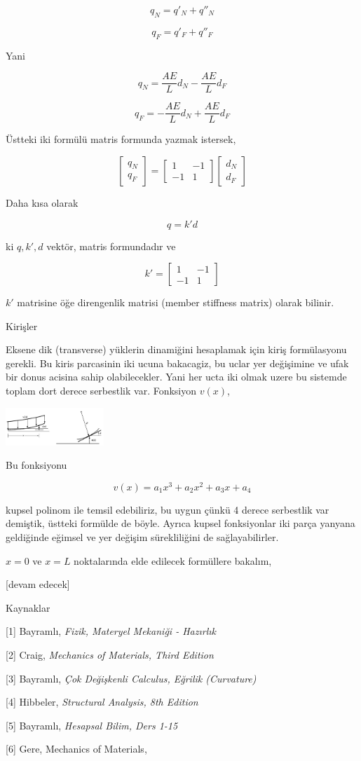 \documentclass[12pt,fleqn]{article}\usepackage{../../common}
\begin{document}
$$
q_N = q'_N + q''_N 
$$

$$
q_F = q'_F + q''_F
$$

Yani

$$
q_N = \frac{AE}{L} d_N - \frac{AE}{L} d_F
$$

$$
q_F = -\frac{AE}{L} d_N + \frac{AE}{L} d_F
$$

Üstteki iki formülü matris formunda yazmak istersek,

$$
\left[\begin{array}{c}
q_N \\ q_F
\end{array}\right] =
\left[\begin{array}{cc}
1 & -1 \\ -1 & 1
\end{array}\right]
\left[\begin{array}{c}
d_N \\ d_F
\end{array}\right] 
$$

Daha kısa olarak

$$
q = k' d
$$

ki $q,k',d$ vektör, matris formundadır ve

$$
k' = \left[\begin{array}{cc}
1 & -1 \\ -1 & 1
\end{array}\right]
$$

$k'$ matrisine öğe direngenlik matrisi (member stiffness matrix) olarak bilinir.

Kirişler

Eksene dik (transverse) yüklerin dinamiğini hesaplamak için kiriş formülasyonu
gerekli. Bu kiris parcasinin iki ucuna bakacagiz, bu uclar yer değişimine ve
ufak bir donus acisina sahip olabilecekler. Yani her ucta iki olmak uzere
bu sistemde toplam dort derece serbestlik var. Fonksiyon $v(x)$,

\includegraphics[width=10em]{phy_020_strs_05_09.jpg}

Bu fonksiyonu

$$
v(x) = a_1 x^3 + a_2 x^2 + a_3 x + a_4 
$$

kupsel polinom ile temsil edebiliriz, bu uygun çünkü 4 derece serbestlik var
demiştik, üstteki formülde de böyle. Ayrıca kupsel fonksiyonlar iki parça
yanyana geldiğinde eğimsel ve yer değişim sürekliliğini de sağlayabilirler.

$x=0$ ve $x=L$ noktalarında elde edilecek formüllere bakalım,

[devam edecek]

Kaynaklar

[1] Bayramlı, {\em Fizik, Materyel Mekaniği - Hazırlık}

[2] Craig, {\em Mechanics of Materials, Third Edition}

[3] Bayramlı, {\em Çok Değişkenli Calculus, Eğrilik (Curvature)}

[4] Hibbeler, {\em Structural Analysis, 8th Edition}

[5] Bayramlı, {\em Hesapsal Bilim, Ders 1-15}

[6] Gere, Mechanics of Materials, 
\end{document}
